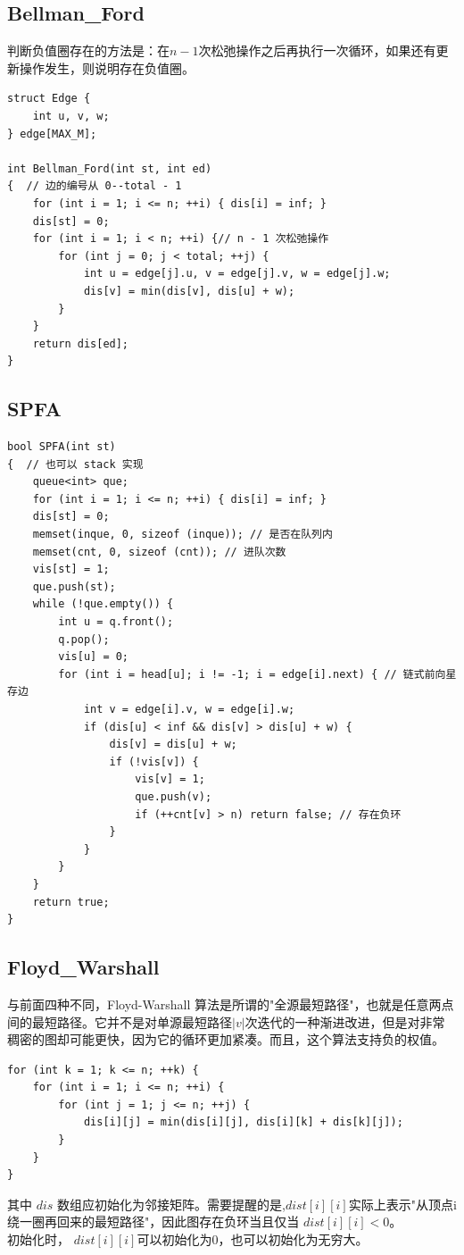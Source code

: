 \subsection{Bellman\_Ford}
判断负值圈存在的方法是：在$n-1$次松弛操作之后再执行一次循环，如果还有更新操作发生，则说明存在负值圈。
\begin{lstlisting}
struct Edge {
    int u, v, w;
} edge[MAX_M];

int Bellman_Ford(int st, int ed)
{  // 边的编号从 0--total - 1
    for (int i = 1; i <= n; ++i) { dis[i] = inf; }
    dis[st] = 0;
    for (int i = 1; i < n; ++i) {// n - 1 次松弛操作
        for (int j = 0; j < total; ++j) {
         	int u = edge[j].u, v = edge[j].v, w = edge[j].w;
            dis[v] = min(dis[v], dis[u] + w);
        }
    }
    return dis[ed];
}
\end{lstlisting}

\subsection{SPFA}
\begin{lstlisting}
bool SPFA(int st)
{  // 也可以 stack 实现
    queue<int> que;
    for (int i = 1; i <= n; ++i) { dis[i] = inf; }
    dis[st] = 0;
    memset(inque, 0, sizeof (inque)); // 是否在队列内
    memset(cnt, 0, sizeof (cnt)); // 进队次数
    vis[st] = 1;
    que.push(st);
    while (!que.empty()) {
        int u = q.front();
        q.pop();
        vis[u] = 0;
        for (int i = head[u]; i != -1; i = edge[i].next) { // 链式前向星存边
            int v = edge[i].v, w = edge[i].w;
            if (dis[u] < inf && dis[v] > dis[u] + w) {
                dis[v] = dis[u] + w;
                if (!vis[v]) {
                    vis[v] = 1;
                    que.push(v);
                    if (++cnt[v] > n) return false; // 存在负环
                }
            }
        }
    }
    return true;
}
\end{lstlisting}
\subsection{Floyd\_Warshall}
与前面四种不同，Floyd-Warshall 算法是所谓的"全源最短路径"，也就是任意两点间的最短路径。它并不是对单源最短路径$|v|$次迭代的一种渐进改进，但是对非常稠密的图却可能更快，因为它的循环更加紧凑。而且，这个算法支持负的权值。
\begin{lstlisting}
for (int k = 1; k <= n; ++k) {
	for (int i = 1; i <= n; ++i) {
		for (int j = 1; j <= n; ++j) {
			dis[i][j] = min(dis[i][j], dis[i][k] + dis[k][j]);
		}
	}
}
\end{lstlisting}
其中 $dis$ 数组应初始化为邻接矩阵。需要提醒的是,$dist[i][i]$实际上表示"从顶点i绕一圈再回来的最短路径"，因此图存在负环当且仅当 $dist[i][i]<0$。 \\
初始化时， $dist[i][i]$可以初始化为0，也可以初始化为无穷大。


